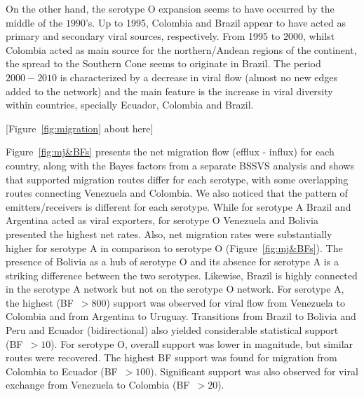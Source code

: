 \documentclass[10pt]{article}
\begin{document}
On the other hand, the serotype O expansion seems to have occurred by the middle of the $1990$'s.
Up to 1995, Colombia and Brazil appear to have acted as primary and secondary viral sources, respectively.
From 1995 to $2000$, whilst Colombia acted as main source for the northern/Andean regions of the continent, the spread to the Southern Cone seems to originate in Brazil.
The period $2000-2010$ is characterized by a decrease in viral flow (almost no new edges added to the network) and the main feature is the increase in viral diversity within countries, specially Ecuador, Colombia and Brazil.

\begin{center}
 [Figure~\ref{fig:migration} about here]
\end{center}

Figure~\ref{fig:mj&BFs} presents the net migration flow (efflux - influx) for each country, along with the Bayes factors from a separate BSSVS analysis and shows that supported migration routes differ for each serotype, with some overlapping routes connecting Venezuela and Colombia. 
We also noticed that the pattern of emitters/receivers is different for each serotype.
While for serotype A Brazil and Argentina acted as viral exporters, for serotype O Venezuela and Bolivia presented the highest net rates.
Also, net migration rates were substantially higher for serotype A in comparison to serotype O (Figure~\ref{fig:mj&BFs}).
The presence of Bolivia as a hub of serotype O and its absence for serotype A is a striking  difference between the two serotypes.
Likewise, Brazil is highly connected in the serotype A network but not on the serotype O network.
For serotype A, the highest (BF~$>800$) support was observed for viral flow from Venezuela to Colombia and from Argentina to Uruguay.
Transitions from Brazil to Bolivia and Peru and Ecuador (bidirectional) also yielded considerable statistical support (BF~$>10$). %
For serotype O, overall support was lower in magnitude, but similar routes were recovered.
The highest BF support was found for migration from Colombia to Ecuador (BF~$>100$).
Significant support was also observed for viral exchange from  Venezuela to Colombia (BF~$>20$). 
\end{document}
